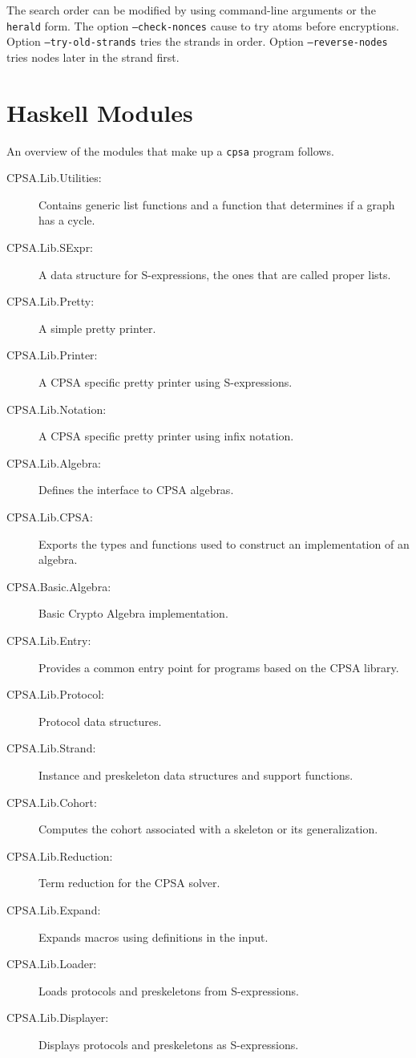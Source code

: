 \documentclass[12pt]{report}
\theoremstyle{definition}
\begin{document}
\enlargethispage{\baselineskip}
The search order can be modified by using command-line arguments or
the \texttt{herald} form.  The option \texttt{--check-nonces} cause
{\cpsa} to try atoms before encryptions.  Option
\texttt{--try-old-strands} tries the strands in order.  Option
\texttt{--reverse-nodes} tries nodes later in the strand first.

\chapter{Haskell Modules}\label{cha:haskell modules}

An overview of the modules that make up a \texttt{cpsa} program
follows.

\begin{description}
\item[CPSA.Lib.Utilities:]
Contains generic list functions and a function that determines if a
graph has a cycle.
\item[CPSA.Lib.SExpr:]
A data structure for S-expressions, the ones that are called
proper lists.
\item[CPSA.Lib.Pretty:]
A simple pretty printer.
\item[CPSA.Lib.Printer:]
A CPSA specific pretty printer using S-expressions.
\item[CPSA.Lib.Notation:]
A CPSA specific pretty printer using infix notation.
\item[CPSA.Lib.Algebra:]
Defines the interface to CPSA algebras.
\item[CPSA.Lib.CPSA:] Exports the types and functions used to
  construct an implementation of an algebra.
\item[CPSA.Basic.Algebra:]
Basic Crypto Algebra implementation.
\item[CPSA.Lib.Entry:]
Provides a common entry point for programs based on the CPSA library.
\item[CPSA.Lib.Protocol:]
Protocol data structures.
\item[CPSA.Lib.Strand:]
Instance and preskeleton data structures and support functions.
\item[CPSA.Lib.Cohort:]
Computes the cohort associated with a skeleton or its generalization.
\item[CPSA.Lib.Reduction:]
Term reduction for the CPSA solver.
\item[CPSA.Lib.Expand:]
Expands macros using definitions in the input.
\item[CPSA.Lib.Loader:]
Loads protocols and preskeletons from S-expressions.
\item[CPSA.Lib.Displayer:]
Displays protocols and preskeletons as S-expressions.
\end{description}
\end{document}
